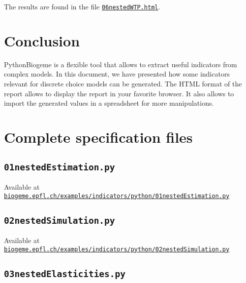 \documentclass[12pt,a4paper]{article}
\begin{document}
The results are found in the file \href{http://biogeme.epfl.ch/examples/indicators/python/06nestedWTP.html}{\lstinline$06nestedWTP.html$}.

\section{Conclusion}

PythonBiogeme is a flexible tool that allows to extract useful
indicators from complex models. In this document, we have presented
how some indicators relevant for discrete choice models  can be
generated. The HTML format of the report  allows to display
the report in your favorite browser. It also allows to import the
generated values in a spreadsheet for more manipulations. 

\clearpage

\appendix

\section{Complete specification files}

\subsection{\lstinline$01nestedEstimation.py$}
\label{sec:01nestedEstimation}

Available at \href{http://biogeme.epfl.ch/examples/indicators/python/01nestedEstimation.py}{\lstinline$biogeme.epfl.ch/examples/indicators/python/01nestedEstimation.py$}



\subsection{\lstinline$02nestedSimulation.py$}

Available at
\href{http://biogeme.epfl.ch/examples/indicators/python/02nestedSimulation.py}{\lstinline$biogeme.epfl.ch/examples/indicators/python/02nestedSimulation.py$}

\label{sec:02nestedSimulation}


\subsection{\lstinline$03nestedElasticities.py$}
\label{sec:03nestedElasticities}
\end{document}
